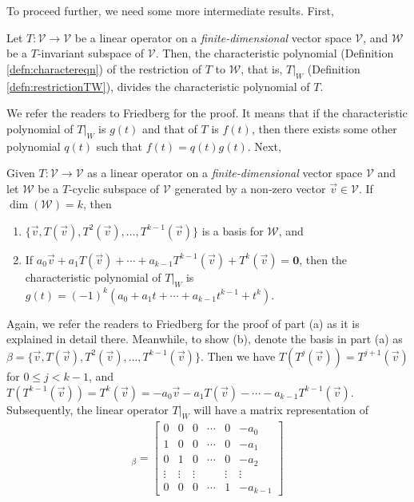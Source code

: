 To proceed further, we need some more intermediate results. First,
\begin{proper}
\label{proper:B12}
Let $T: \mathcal{V} \to \mathcal{V}$ be a linear operator on a \textit{finite-dimensional} vector space $\mathcal{V}$, and $\mathcal{W}$ be a $T$-invariant subspace of $\mathcal{V}$. Then, the characteristic polynomial (Definition \ref{defn:charactereqn}) of the restriction of $T$ to $\mathcal{W}$, that is, $T|_W$ (Definition \ref{defn:restrictionTW}), divides the characteristic polynomial of $T$.
\end{proper}
We refer the readers to Friedberg for the proof. It means that if the characteristic polynomial of $T|_W$ is $g(t)$ and that of $T$ is $f(t)$, then there exists some other polynomial $q(t)$ such that $f(t) = q(t)g(t)$. Next,
\begin{proper}
\label{proper:B13}
Given $T: \mathcal{V} \to \mathcal{V}$ as a linear operator on a \textit{finite-dimensional} vector space $\mathcal{V}$ and let $\mathcal{W}$ be a $T$-cyclic subspace of $\mathcal{V}$ generated by a non-zero vector $\vec{v} \in \mathcal{V}$. If $\dim(\mathcal{W}) = k$, then
\begin{enumerate}[label=(\alph*)]
    \item $\{\vec{v}, T(\vec{v}), T^2(\vec{v}), \ldots, T^{k-1}(\vec{v})\}$ is a basis for $\mathcal{W}$, and
    \item If $a_0 \vec{v} + a_1 T(\vec{v}) + \cdots + a_{k-1}T^{k-1}(\vec{v}) + T^k(\vec{v}) = \textbf{0}$, then the characteristic polynomial of $T|_W$ is $g(t) = (-1)^k (a_0 + a_1t + \cdots + a_{k-1}t^{k-1} + t^k)$.
\end{enumerate}
\end{proper}
Again, we refer the readers to Friedberg for the proof of part (a) as it is explained in detail there. Meanwhile, to show (b), denote the basis in part (a) as $\mathcal{\beta} = \{\vec{v}, T(\vec{v}), T^2(\vec{v}), \ldots, T^{k-1}(\vec{v})\}$. Then we have $T(T^j(\vec{v})) = T^{j+1}(\vec{v})$ for $0 \leq j < k-1$, and $T(T^{k-1}(\vec{v})) = T^k(\vec{v}) = -a_0 \vec{v} - a_1 T(\vec{v}) - \cdots - a_{k-1}T^{k-1}(\vec{v})$. Subsequently, the linear operator $T|_W$ will have a matrix representation of
\begin{align}
[T|_W]_\beta = 
\begin{bmatrix}
0 & 0 & 0 & \cdots & 0 & -a_0 \\
1 & 0 & 0 & \cdots & 0 & -a_1 \\
0 & 1 & 0 & \cdots & 0 & -a_2 \\
\vdots & \vdots & \vdots & & \vdots & \vdots \\
0 & 0 & 0 & \cdots & 1 & -a_{k-1}
\end{bmatrix}
\end{align}
